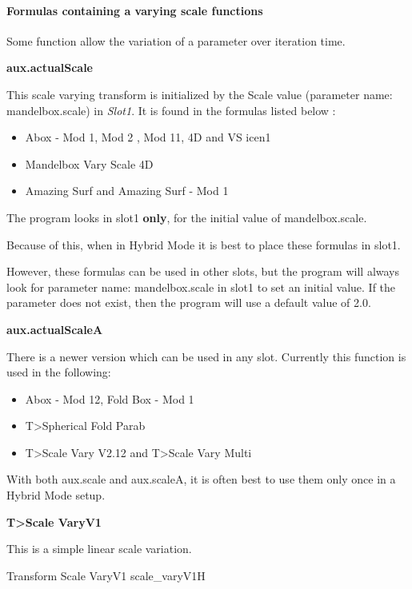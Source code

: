 \paragraph{Formulas containing a varying scale functions}

Some function allow the variation of a parameter over iteration time.


\textbf{aux.actualScale}

This scale varying transform is initialized by the Scale value (parameter name: mandelbox.scale) in \emph{Slot1}. It is found in the formulas listed below :

\begin{itemize}
	\item Abox - Mod 1, Mod 2 , Mod 11, 4D and  VS icen1
	\item Mandelbox Vary Scale 4D
	\item Amazing Surf  and Amazing Surf - Mod 1
\end{itemize}

The program looks  in slot1 \textbf{only}, for the initial value of  mandelbox.scale.

Because of this, when in Hybrid Mode it is best to place these formulas in slot1.

However, these formulas can be used in other slots, but the program will always look for parameter name: mandelbox.scale  in slot1 to set an initial value. If the parameter does not exist, then the program will use a default value of 2.0.


\textbf{aux.actualScaleA}

There is a newer version which can be used in any slot. Currently this function is used in  the following:

\begin{itemize}
	\item Abox - Mod 12, Fold Box - Mod 1
	\item T>Spherical Fold Parab
	\item T>Scale Vary V2.12 and T>Scale Vary Multi
	\end{itemize}
	
With both aux.scale and aux.scaleA, it is often best to use them only once in a Hybrid Mode setup.

\textbf{T>Scale VaryV1}

This is a simple linear scale variation.

{Transform Scale VaryV1}
{scale_varyV1}{H}

